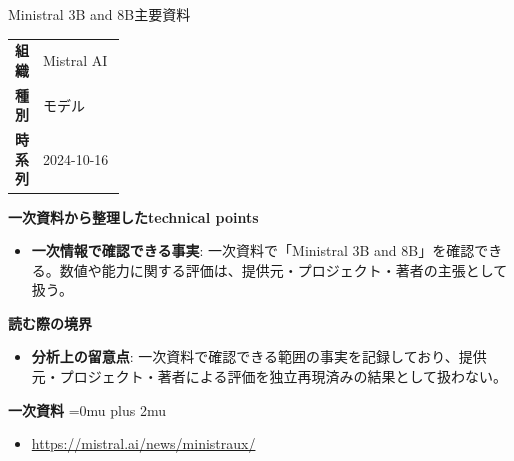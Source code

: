 \begin{technicalnote}{Ministral 3B and 8B}{主要資料}
\begingroup
\begin{tabularx}{\linewidth}{@{}>{\bfseries}p{0.22\linewidth}X@{}}
組織 & Mistral AI \\
種別 & モデル \\
時系列 & 2024-10-16 \\
\end{tabularx}
\smallskip
{\bfseries 一次資料から整理したtechnical points}
\begin{itemize}[leftmargin=1.5em,itemsep=0.35em]
\item \textbf{一次情報で確認できる事実}: 一次資料で「Ministral 3B and 8B」を確認できる。数値や能力に関する評価は、提供元・プロジェクト・著者の主張として扱う。
\end{itemize}
\begin{minipage}{\linewidth}
{\bfseries 読む際の境界}
\begin{itemize}[leftmargin=1.5em,itemsep=0.35em]
\item \textbf{分析上の留意点}: 一次資料で確認できる範囲の事実を記録しており、提供元・プロジェクト・著者による評価を独立再現済みの結果として扱わない。
\end{itemize}
\begin{samepage}
{\bfseries 一次資料}
\begingroup\sloppy
\Urlmuskip=0mu plus 2mu\relax
\begin{itemize}[leftmargin=1.5em,itemsep=0.25em]
\item {\scriptsize\url{https://mistral.ai/news/ministraux/}}
\end{itemize}
\endgroup
\end{samepage}
\end{minipage}
\endgroup
\end{technicalnote}
\medskip


